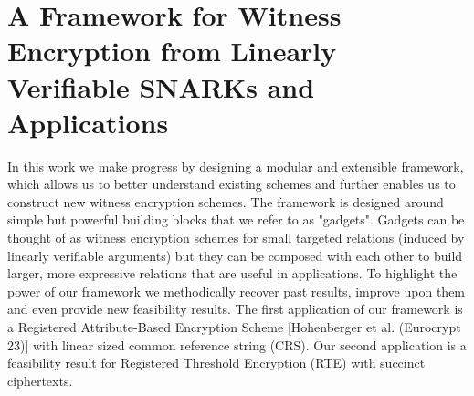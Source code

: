 \documentclass[11pt]{article}
\theoremstyle{definition}
\theoremstyle{remark}
\theoremstyle{plain}
\begin{document}
\section{\cite{cryptoeprint:2025/1364} A Framework for Witness Encryption from Linearly Verifiable {SNARKs} and Applications}

In this work we make progress by designing a modular and extensible framework, which allows us to better understand existing schemes and further enables us to construct new witness encryption schemes. The framework is designed around simple but powerful building blocks that we refer to as "gadgets". Gadgets can be thought of as witness encryption schemes for small targeted relations (induced by linearly verifiable arguments) but they can be composed with each other to build larger, more expressive relations that are useful in applications. To highlight the power of our framework we methodically recover past results, improve upon them and even provide new feasibility results.
The first application of our framework is a Registered Attribute-Based Encryption Scheme [Hohenberger et al. (Eurocrypt 23)] with linear sized common reference string (CRS). 
Our second application is a feasibility result for Registered Threshold Encryption (RTE) with succinct ciphertexts. 




\end{document}
